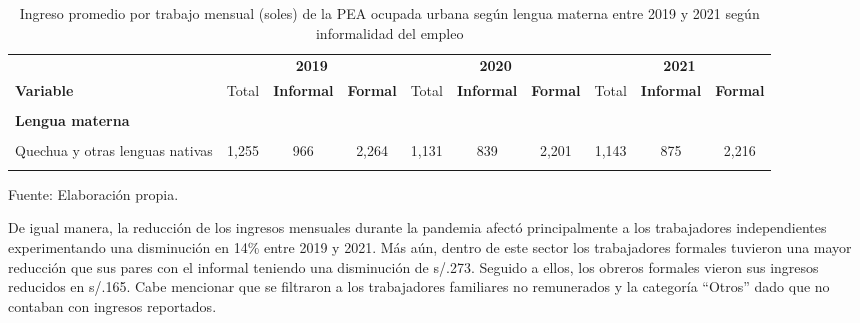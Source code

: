 \documentclass[
  letterpaper,
  12pt,
  oneside,
  spanish,
  doublespacing,
  headsepline,
  parskip]{MastersDoctoralThesis}
\begin{document}
\hypertarget{tbl-ing_leng}{}
\begin{table}[H]
\caption{\label{tbl-ing_leng}Ingreso promedio por trabajo mensual (soles) de la PEA ocupada urbana
según lengua materna entre 2019 y 2021 según informalidad del empleo }\tabularnewline

\centering\begingroup\fontsize{9}{11}\selectfont

\begin{tabular}{>{\centering\arraybackslash}p{10em}ccccccccc}
\toprule
\multicolumn{1}{c}{ } & \multicolumn{3}{c}{\textbf{2019}} & \multicolumn{3}{c}{\textbf{2020}} & \multicolumn{3}{c}{\textbf{2021}} \\
\cmidrule(l{3pt}r{3pt}){2-4} \cmidrule(l{3pt}r{3pt}){5-7} \cmidrule(l{3pt}r{3pt}){8-10}
\textbf{Variable} & Total & \textbf{Informal} & \textbf{Formal} & Total & \textbf{Informal} & \textbf{Formal} & Total & \textbf{Informal} & \textbf{Formal}\\
\midrule
\cellcolor{gray!6}{\textbf{Nacional}} & \cellcolor{gray!6}{1,595} & \cellcolor{gray!6}{1,037} & \cellcolor{gray!6}{2,599} & \cellcolor{gray!6}{1,407} & \cellcolor{gray!6}{901} & \cellcolor{gray!6}{2,380} & \cellcolor{gray!6}{1,443} & \cellcolor{gray!6}{989} & \cellcolor{gray!6}{2,473}\\
\textbf{Lengua materna} &  &  &  &  &  &  &  &  & \\
\cellcolor{gray!6}{Castellano} & \cellcolor{gray!6}{1,645} & \cellcolor{gray!6}{1,050} & \cellcolor{gray!6}{2,627} & \cellcolor{gray!6}{1,453} & \cellcolor{gray!6}{911} & \cellcolor{gray!6}{2,398} & \cellcolor{gray!6}{1,493} & \cellcolor{gray!6}{1,011} & \cellcolor{gray!6}{2,496}\\
Quechua y otras lenguas nativas & 1,255 & 966 & 2,264 & 1,131 & 839 & 2,201 & 1,143 & 875 & 2,216\\
\cellcolor{gray!6}{Otros} & \cellcolor{gray!6}{2,050} & \cellcolor{gray!6}{1,410} & \cellcolor{gray!6}{2,918} & \cellcolor{gray!6}{1,610} & \cellcolor{gray!6}{1,399} & \cellcolor{gray!6}{2,416} & \cellcolor{gray!6}{1,657} & \cellcolor{gray!6}{970} & \cellcolor{gray!6}{3,062}\\
\bottomrule
\end{tabular}
\endgroup{}
\end{table}

\noindent \small Fuente: Elaboración propia. \normalsize

De igual manera, la reducción de los ingresos mensuales durante la
pandemia afectó principalmente a los trabajadores independientes
experimentando una disminución en 14\% entre 2019 y 2021. Más aún,
dentro de este sector los trabajadores formales tuvieron una mayor
reducción que sus pares con el informal teniendo una disminución de
s/.273. Seguido a ellos, los obreros formales vieron sus ingresos
reducidos en s/.165. Cabe mencionar que se filtraron a los trabajadores
familiares no remunerados y la categoría ``Otros'' dado que no contaban
con ingresos reportados.
\end{document}
